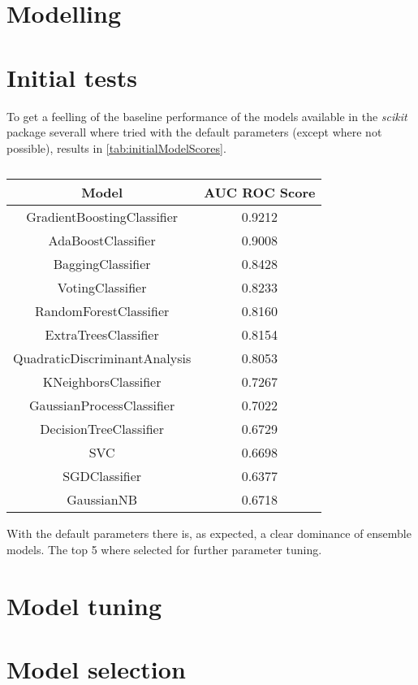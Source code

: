 \section{Modelling}
\label{sec:modelling}

\section{Initial tests}
\label{sec:initialTests}
To get a feelling of the baseline performance of the models available in
the \emph{scikit} package severall where tried with the default parameters
(except where not possible), results in \vref{tab:initialModelScores}.

\begin{table}[!h]
    \caption{}
    \label{tab:initialModelScores}
    \centering
    \begin{tabular}{cc}
        Model & AUC ROC Score \\
        \hline
        GradientBoostingClassifier & 0.9212 \\
        AdaBoostClassifier & 0.9008 \\
        BaggingClassifier & 0.8428 \\
        VotingClassifier & 0.8233 \\
        RandomForestClassifier & 0.8160 \\
        ExtraTreesClassifier & 0.8154 \\
        QuadraticDiscriminantAnalysis & 0.8053 \\
        KNeighborsClassifier & 0.7267 \\
        GaussianProcessClassifier & 0.7022 \\
        DecisionTreeClassifier & 0.6729 \\
        SVC & 0.6698 \\
        SGDClassifier & 0.6377 \\
        GaussianNB & 0.6718 \\
    \end{tabular}
\end{table}


With the default parameters there is, as expected, a clear dominance of
ensemble models.
The top 5 where selected for further parameter tuning.

\section{Model tuning}
\label{sec:modelTuning}

\blindtext

\section{Model selection}
\label{sec:modelSelection}

\blindtext
